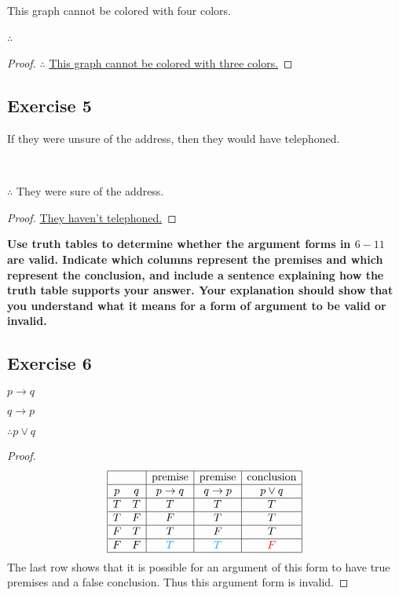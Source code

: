 \documentclass[14pt]{extarticle}
\newcommand{\fbl}{\underline{\hspace{1cm}}\,\,}
\begin{document}
This graph cannot be colored with four colors.

$\therefore$ \fbl

\begin{proof}
    $\therefore$ \underline{This graph cannot be colored with three colors.}
\end{proof}

\subsection{Exercise 5}
If they were unsure of the address, then they would have telephoned.

\fbl

$\therefore$ They were sure of the address.

\begin{proof}
    \underline{They haven't telephoned.}
\end{proof}

{\bf \color{cyan} Use truth tables to determine whether the argument forms in $6-11$ are valid. Indicate which columns represent the premises and which represent the conclusion, and include a sentence explaining how the truth table supports your answer. Your explanation should show that you understand what it
means for a form of argument to be valid or invalid.}

\subsection{Exercise 6}
$p \to q$

$q \to p$

$\therefore p \vee q$

\begin{proof}
    $$
        \begin{array}{|cc|c|c|c|}
            \hline
              &   & \text{premise} & \text{premise} & \text{conclusion} \\ \hline
            p & q & p \to q        & q \to p        & p \vee q          \\
            \hline
            T & T & T              & T              & T                 \\
            \hline
            T & F & F              & T              & T                 \\
            \hline
            F & T & T              & F              & T                 \\
            \hline
            F & F & \color{cyan} T & \color{cyan} T & \color{red} F     \\
            \hline
        \end{array}
    $$
    The last row shows that it is possible for an argument of
    this form to have true premises and a false conclusion. Thus this argument form is invalid.
\end{proof}
\end{document}

